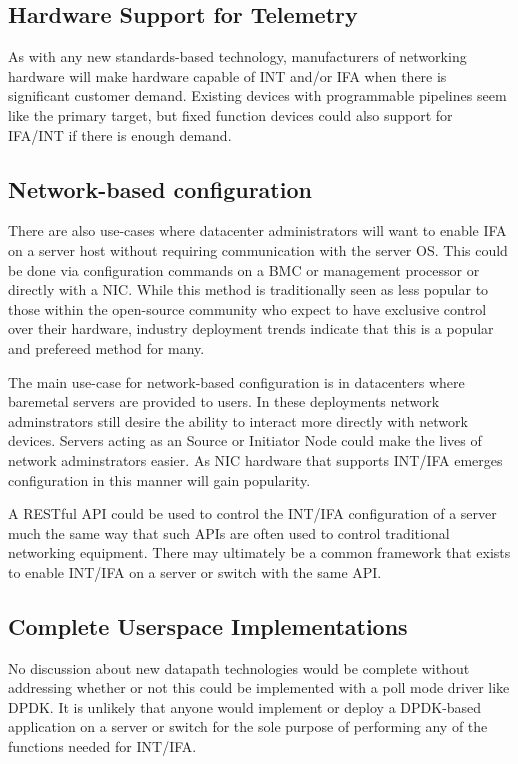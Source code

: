\documentclass[letterpaper,twocolumn,10pt]{article}
\begin{document}
\subsection{Hardware Support for Telemetry}

As with any new standards-based technology, manufacturers of networking
hardware will make hardware capable of INT and/or IFA when there is
significant customer demand.  Existing devices with programmable
pipelines seem like the primary target, but fixed function devices could
also support for IFA/INT if there is enough demand.

\subsection{Network-based configuration}

There are also use-cases where datacenter administrators will want to
enable IFA on a server host without requiring communication with the
server OS.  This could be done via configuration commands on a BMC or
management processor or directly with a NIC.  While this method is
traditionally seen as less popular to those within the open-source
community who expect to have exclusive control over their hardware,
industry deployment trends indicate that this is a popular and prefereed
method for many.

The main use-case for network-based configuration is in datacenters
where baremetal servers are provided to users.  In these deployments
network adminstrators still desire the ability to interact more directly
with network devices.  Servers acting as an Source or Initiator Node
could make the lives of network adminstrators easier.  As NIC hardware
that supports INT/IFA emerges configuration in this manner will gain
popularity.

A RESTful API could be used to control the INT/IFA configuration
of a server much the same way that such APIs are often used to control
traditional networking equipment.  There may ultimately be a common
framework that exists to enable INT/IFA on a server or switch with the
same API.

\subsection{Complete Userspace Implementations}

No discussion about new datapath technologies would be complete without
addressing whether or not this could be implemented with a poll mode
driver like DPDK\cite{DPDK}.  It is unlikely that anyone would implement
or deploy a DPDK-based application on a server or switch for the sole
purpose of performing any of the functions needed for INT/IFA.
\end{document}
